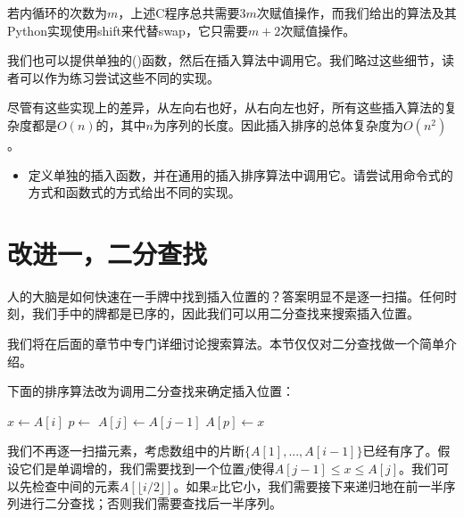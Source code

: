 \documentclass{ctexart}
\begin{document}
若内循环的次数为$m$，上述C程序总共需要$3m$次赋值操作，而我们给出的算法及其Python实现使用shift来代替swap，它只需要$m+2$次赋值操作。

我们也可以提供单独的()函数，然后在插入算法中调用它。我们略过这些细节，读者可以作为练习尝试这些不同的实现。

尽管有这些实现上的差异，从左向右也好，从右向左也好，所有这些插入算法的复杂度都是$O(n)$的，其中$n$为序列的长度。因此插入排序的总体复杂度为$O(n^2)$。

\begin{Exercise}

\begin{itemize}
\item 定义单独的插入函数，并在通用的插入排序算法中调用它。请尝试用命令式的方式和函数式的方式给出不同的实现。
\end{itemize}

\end{Exercise}


\section{改进一，二分查找}

人的大脑是如何快速在一手牌中找到插入位置的？答案明显不是逐一扫描。任何时刻，我们手中的牌都是已序的，因此我们可以用二分查找来搜索插入位置。

我们将在后面的章节中专门详细讨论搜索算法。本节仅仅对二分查找做一个简单介绍。

下面的排序算法改为调用二分查找来确定插入位置：

\begin{algorithmic}[1]
    \State $x \gets A[i]$
    \State $p \gets $ 
      \State $A[j] \gets A[j-1]$
    \EndFor
    \State $A[p] \gets x$
  \EndFor
\EndFunction
\end{algorithmic}

我们不再逐一扫描元素，考虑数组中的片断$\{A[1], ..., A[i-1] \}$已经有序了。假设它们是单调增的，我们需要找到一个位置$j$使得$A[j-1] \leq x \leq A[j]$。我们可以先检查中间的元素$A[\lfloor i/2 \rfloor]$。如果$x$比它小，我们需要接下来递归地在前一半序列进行二分查找；否则我们需要查找后一半序列。
\end{document}
